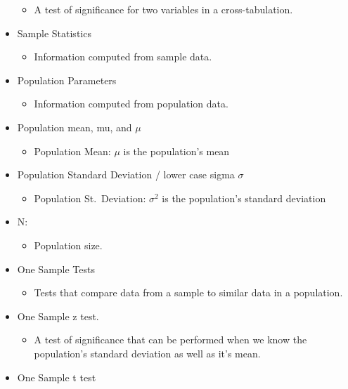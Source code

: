 \documentclass[]{article}
\begin{document}
\begin{itemize}
  \begin{itemize}
  \itemsep1pt\parskip0pt
  \item
    A test of significance for two variables in a cross-tabulation.
  \end{itemize}
\item
  Sample Statistics

  \begin{itemize}
  \itemsep1pt\parskip0pt
  \item
    Information computed from sample data.
  \end{itemize}
\item
  Population Parameters

  \begin{itemize}
  \itemsep1pt\parskip0pt
  \item
    Information computed from population data.
  \end{itemize}
\item
  Population mean, mu, and $\mu$

  \begin{itemize}
  \itemsep1pt\parskip0pt
  \item
    Population Mean: $\mu$ is the population's mean
  \end{itemize}
\item
  Population Standard Deviation / lower case sigma $\sigma$

  \begin{itemize}
  \itemsep1pt\parskip0pt
  \item
    Population St.~Deviation: $\sigma^2$ is the population's standard
    deviation
  \end{itemize}
\item
  N:

  \begin{itemize}
  \itemsep1pt\parskip0pt
  \item
    Population size.
  \end{itemize}
\item
  One Sample Tests

  \begin{itemize}
  \itemsep1pt\parskip0pt
  \item
    Tests that compare data from a sample to similar data in a
    population.
  \end{itemize}
\item
  One Sample z test.

  \begin{itemize}
  \itemsep1pt\parskip0pt
  \item
    A test of significance that can be performed when we know the
    population's standard deviation as well as it's mean.
  \end{itemize}
\item
  One Sample t test


\end{itemize}
\end{document}
